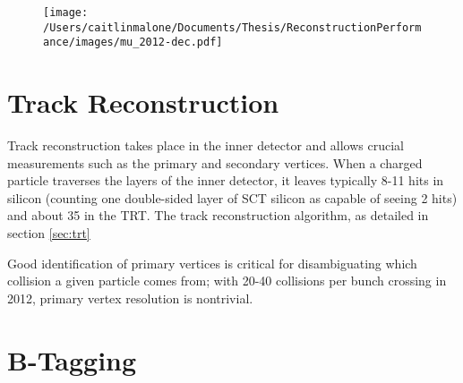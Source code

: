 \begin{figure}
	\texttt{[image: /Users/caitlinmalone/Documents/Thesis/ReconstructionPerformance/images/mu\_2012-dec.pdf]}
	\label{fig:inner_detector}  
	\caption{}
\end{figure}

\section{Track Reconstruction}
\label{sec:trk_reco}
Track reconstruction takes place in the inner detector and allows crucial measurements such as the primary and secondary vertices.  When a charged particle traverses the layers of the inner detector, it leaves typically 8-11 hits in silicon (counting one double-sided layer of SCT silicon as capable of seeing 2 hits) and about 35 in the TRT.  The track reconstruction algorithm, as detailed in section \ref{sec:trt}

Good identification of primary vertices is critical for disambiguating which collision a given particle comes from; with 20-40 collisions per bunch crossing in 2012, primary vertex resolution is nontrivial.  

\section{B-Tagging}





